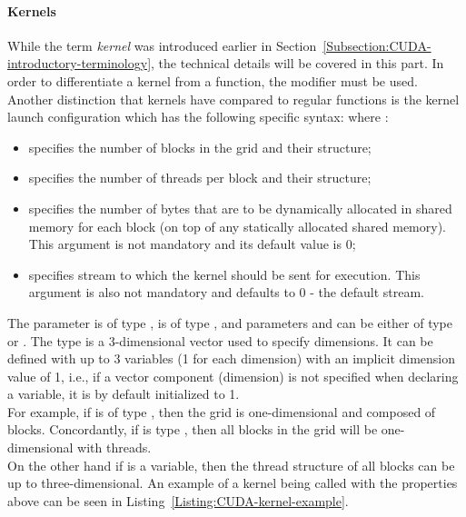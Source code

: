 \paragraph{Kernels}\label{Paragraph:theory-CUDA-c++-CUDA-extensions-kernels}
While the term \textit{kernel} was introduced earlier in Section~\ref{Subsection:CUDA-introductory-terminology}, the technical details will be covered in this part. In order to differentiate a kernel from a function, the  modifier must be used. Another distinction that kernels have compared to regular functions is the kernel launch configuration which has the following specific syntax:   where \cite{NVIDIAMay2022, Cejka2020}:

\begin{itemize}
	\item {} specifies the number of blocks in the grid and their structure;
	\item {} specifies the number of threads per block and their structure;
	\item {} specifies the number of bytes that are to be dynamically allocated in shared memory for each block (on top of any statically allocated shared memory). This argument is not mandatory and its default value is 0;
	\item {} specifies stream to which the kernel should be sent for execution. This argument is also not mandatory and defaults to 0 - the default stream.
\end{itemize}

The  parameter is of type ,  is of type , and parameters  and  can be either of type  or . The  type is a 3-dimensional  vector used to specify dimensions. It can be defined with up to 3 variables (1 for each dimension) with an implicit dimension value of 1, i.e., if a vector component (dimension) is not specified when declaring a  variable, it is by default initialized to 1. \\
For example, if  is of type , then the grid is one-dimensional and composed of  blocks. Concordantly, if  is type , then all blocks in the grid will be one-dimensional with  threads. \\
On the other hand if  is a  variable, then the thread structure of all blocks can be up to three-dimensional. An example of a kernel being called with the properties above can be seen in Listing~\ref{Listing:CUDA-kernel-example}.


